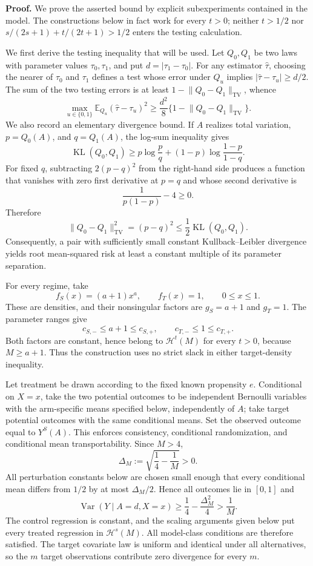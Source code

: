 \textbf{Proof.}
We prove the asserted bound by explicit subexperiments contained in the model.  The constructions below in fact work for every \(t>0\); neither \(t>1/2\) nor \(s/(2s+1)+t/(2t+1)>1/2\) enters the testing calculation.

We first derive the testing inequality that will be used.  Let \(Q_0,Q_1\) be two laws with parameter values \(\tau_0,\tau_1\), and put \(d=|\tau_1-\tau_0|\).  For any estimator \(\widehat\tau\), choosing the nearer of \(\tau_0\) and \(\tau_1\) defines a test whose error under \(Q_u\) implies \(|\widehat\tau-\tau_u|\ge d/2\).  The sum of the two testing errors is at least \(1-\lVert Q_0-Q_1\rVert_{\mathrm{TV}}\), whence
\[
 \max_{u\in\{0,1\}}\mathbb E_{Q_u}
       (\widehat\tau-\tau_u)^2
 \ge \frac{d^2}{8}
       \{1-\lVert Q_0-Q_1\rVert_{\mathrm{TV}}\}.
\]
We also record an elementary divergence bound.  If \(A\) realizes total variation, \(p=Q_0(A)\), and \(q=Q_1(A)\), the log-sum inequality gives
\[
 \operatorname{KL}(Q_0,Q_1)\ge
 p\log\frac pq+(1-p)\log\frac{1-p}{1-q}.
\]
For fixed \(q\), subtracting \(2(p-q)^2\) from the right-hand side produces a function that vanishes with zero first derivative at \(p=q\) and whose second derivative is
\[
 \frac1{p(1-p)}-4\ge0.
\]
Therefore
\[
 \lVert Q_0-Q_1\rVert_{\mathrm{TV}}^2
 =(p-q)^2\le\frac12\operatorname{KL}(Q_0,Q_1).
\]
Consequently, a pair with sufficiently small constant Kullback--Leibler divergence yields root mean-squared risk at least a constant multiple of its parameter separation.

For every regime, take
\[
 f_S(x)=(a+1)x^a,
 \qquad f_T(x)=1,
 \qquad 0\le x\le1.
\]
These are densities, and their nonsingular factors are \(g_S=a+1\) and \(g_T=1\).  The parameter ranges give
\[
 c_{S,-}\le a+1\le c_{S,+},
 \qquad
 c_{T,-}\le1\le c_{T,+}.
\]
Both factors are constant, hence belong to \(\mathcal H^t(M)\) for every \(t>0\), because \(M\ge a+1\).  Thus the construction uses no strict slack in either target-density inequality.

Let treatment be drawn according to the fixed known propensity \(e\).  Conditional on \(X=x\), take the two potential outcomes to be independent Bernoulli variables with the arm-specific means specified below, independently of \(A\); take target potential outcomes with the same conditional means.  Set the observed outcome equal to \(Y^S(A)\).  This enforces consistency, conditional randomization, and conditional mean transportability.  Since \(M>4\),
\[
 \Delta_M:=\sqrt{\frac14-\frac1M}>0.
\]
All perturbation constants below are chosen small enough that every conditional mean differs from \(1/2\) by at most \(\Delta_M/2\).  Hence all outcomes lie in \([0,1]\) and
\[
 \operatorname{Var}(Y\mid A=d,X=x)
 \ge \frac14-\frac{\Delta_M^2}{4}
 >\frac1M.
\]
The control regression is constant, and the scaling arguments given below put every treated regression in \(\mathcal H^s(M)\).  All model-class conditions are therefore satisfied.  The target covariate law is uniform and identical under all alternatives, so the \(m\) target observations contribute zero divergence for every \(m\).

